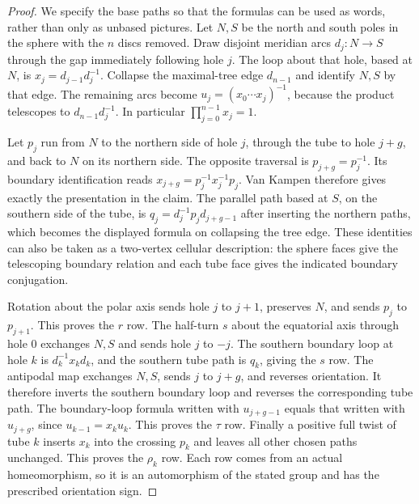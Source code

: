 \begin{proof}
We specify the base paths so that the formulas can be used as words,
rather than only as unbased pictures. Let $N,S$ be the north and south
poles in the sphere with the $n$ discs removed. Draw disjoint meridian
arcs $d_j:N\to S$ through the gap immediately following hole $j$.
The loop about that hole, based at $N$, is
$x_j=d_{j-1}d_j^{-1}$. Collapse the maximal-tree edge $d_{n-1}$ and
identify $N,S$ by that edge. The remaining arcs become
$u_j=(x_0\cdots x_j)^{-1}$, because the product telescopes to
$d_{n-1}d_j^{-1}$. In particular $\prod_{j=0}^{n-1}x_j=1$.

Let $p_j$ run from $N$ to the northern side of hole $j$, through the
tube to hole $j+g$, and back to $N$ on its northern side. The opposite
traversal is $p_{j+g}=p_j^{-1}$. Its boundary identification reads
$x_{j+g}=p_j^{-1}x_j^{-1}p_j$. Van Kampen therefore gives exactly the
presentation in the claim. The parallel path based at $S$, on the
southern side of the tube, is
$q_j=d_j^{-1}p_jd_{j+g-1}$ after inserting the northern paths, which
becomes the displayed formula on collapsing the tree edge.
These identities can also be taken as a two-vertex cellular description:
the sphere faces give the telescoping boundary relation and each tube
face gives the indicated boundary conjugation.

Rotation about the polar axis sends hole $j$ to $j+1$, preserves $N$,
and sends $p_j$ to $p_{j+1}$. This proves the $r$ row. The half-turn
$s$ about the equatorial axis through hole $0$ exchanges $N,S$ and
sends hole $j$ to $-j$. The southern boundary loop at hole $k$ is
$d_k^{-1}x_kd_k$, and the southern tube path is $q_k$, giving the
$s$ row. The antipodal map exchanges $N,S$, sends $j$ to $j+g$,
and reverses orientation. It therefore inverts the southern boundary
loop and reverses the corresponding tube path. The boundary-loop
formula written with $u_{j+g-1}$ equals that written with $u_{j+g}$,
since $u_{k-1}=x_ku_k$. This proves the $\tau$ row. Finally a positive
full twist of tube $k$ inserts $x_k$ into the crossing $p_k$ and
leaves all other chosen paths unchanged. This proves the $\rho_k$ row.
Each row comes from an actual homeomorphism, so it is an automorphism
of the stated group and has the prescribed orientation sign.


\end{proof}
